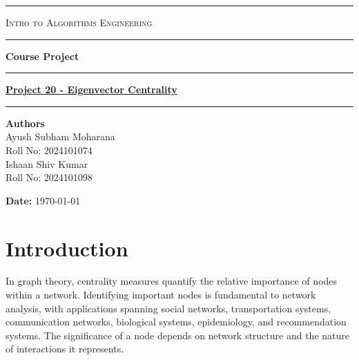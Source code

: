 \documentclass[12pt]{article}
\begin{document}
\begin{titlepage}
\thispagestyle{empty}
\centering

\vspace*{1.5cm}

\noindent\rule{\textwidth}{0.6pt}

\vspace{0.5cm}
{\LARGE \textsc{Intro to Algorithms Engineering}}
\vspace{0.5cm}

\noindent\rule{\textwidth}{0.6pt}

\vspace{0.8cm}

{\Large \textbf{Course Project}}

\vspace{0.8cm}

\noindent\rule{\textwidth}{0.6pt}

\vspace{0.5cm}
{\LARGE \textbf{\href{https://github.com/catintrenches1234/eigenvector-centrality}{Project 20 - Eigenvector Centrality}}}
\vspace{0.5cm}

\noindent\rule{\textwidth}{0.6pt}

\vfill

{\Large \textbf{Authors}}\\[0.8cm]

{\large
Ayush Subham Moharana\\Roll No: 2024101074\\[0.3cm]
Ishaan Shiv Kumar\\Roll No: 2024101098
}

\vfill

{\large \textbf{Date:}} \today

\end{titlepage}

\clearpage
{}

\setcounter{tocdepth}{2}
\tableofcontents

\clearpage
{}

\section{Introduction}

In graph theory, centrality measures quantify the relative importance of nodes within a network. Identifying important nodes is fundamental to network analysis, with applications spanning social networks, transportation systems, communication networks, biological systems, epidemiology, and recommendation systems. The significance of a node depends on network structure and the nature of interactions it represents.
\end{document}
